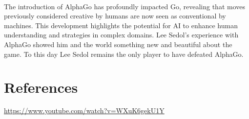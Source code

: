 \documentclass[final]{article}
\begin{document}
\paragraph{}
The introduction of AlphaGo has profoundly impacted Go, revealing that moves previously considered creative by humans are now seen as conventional by machines. This development highlights the potential for AI to enhance human understanding and strategies in complex domains. Lee Sedol’s experience with AlphaGo showed him and the world something new and beautiful about the game. To this day Lee Sedol remains the only player to have defeated AlphaGo.

\section{References}
\url{https://www.youtube.com/watch?v=WXuK6gekU1Y}
\end{document}
